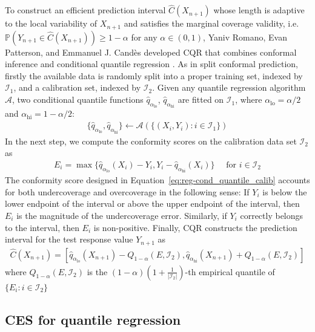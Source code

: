 To construct an efficient prediction interval $\hat{C}(X_{n+1})$ whose length is adaptive to the local variability of $X_{n+1}$ and satisfies the marginal coverage validity, i.e. $\mathbb{P}(Y_{n+1} \in \hat{C}(X_{n+1})) \geq 1-\alpha$ for any $\alpha \in (0,1)$, Yaniv Romano, Evan Patterson, and Emmanuel J. Candès developed CQR that combines conformal inference \cite{vovk1999machine} \cite{vovk2005algorithmic} and conditional quantile regression \cite{koenker1978quantreg}. As in split conformal prediction, firstly the available data is  randomly split into a proper training set, indexed by $\mathcal{I}_1$, and a calibration set, indexed by $\mathcal{I}_2$. Given any quantile regression algorithm $\mathcal{A}$, two conditional quantile functions $\hat{q}_{\alpha_{\text{lo}}}$, $\hat{q}_{\alpha_{\text{hi}}}$ are fitted on $\mathcal{I}_1$, where $\alpha_{\text{lo}} = \alpha/2$ and $\alpha_{\text{hi}} = 1-\alpha/2$: 
\begin{align} \label{eq:reg-cond_quantile_fit}
    \{ \hat{q}_{\alpha_{\text{lo}}}, \hat{q}_{\alpha_{\text{hi}}} \} \leftarrow \mathcal{A}(\{ (X_i, Y_i): i \in \mathcal{I}_1 \})
\end{align}
In the next step, we compute the conformity scores on the calibration data set $\mathcal{I}_2$ as 
\begin{align} \label{eq:reg-cond_quantile_calib}
    E_i = \max \{ \hat{q}_{\alpha_{\text{lo}}}(X_i) - Y_i, Y_i - \hat{q}_{\alpha_{\text{hi}}}(X_i) \} \quad \text{ for } i \in \mathcal{I}_2
\end{align}
The conformity score designed in Equation~\ref{eq:reg-cond_quantile_calib} accounts for both undercoverage and overcoverage in the following sense: If $Y_i$ is below the lower endpoint of the interval or above the upper endpoint of the interval, then $E_i$ is the magnitude of the undercoverage error. Similarly, if $Y_i$ correctly belongs to the interval, then $E_i$ is non-positive. 
Finally, CQR constructs the prediction interval for the test response value $Y_{n+1}$ as
\begin{align} \label{eq:reg-cond_quantile_construct_pi}
    \hat{C}(X_{n+1}) = [ \hat{q}_{\alpha_{\text{lo}}}(X_{n+1}) - Q_{1-\alpha}(E, \mathcal{I}_2), \hat{q}_{\alpha_{\text{hi}}}(X_{n+1}) + Q_{1-\alpha}(E, \mathcal{I}_2)
    ]
\end{align}
where $Q_{1-\alpha}(E, \mathcal{I}_2)$ is the $(1-\alpha)(1+\frac{1}{|\mathcal{I}_2|})$-th empirical quantile of $\{E_i: i\in \mathcal{I}_2\}$


\subsection{CES for quantile regression}

